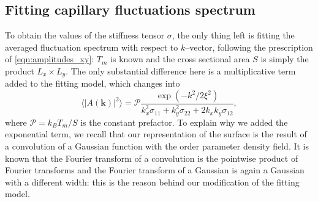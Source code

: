 


\subsection{Fitting capillary fluctuations spectrum}
To obtain the values of the stiffness tensor $\sigma$, the only thing left is fitting the averaged fluctuation spectrum with respect to $k$--vector, following the prescription of \cref{eqn:amplitudes_xy}: $T_m$ is known and the cross sectional area $S$ is simply the product $L_x\times L_y$. The only substantial difference here is a multiplicative term added to the fitting model, which changes into
\begin{equation}
\label{eqn:fit-model}
    \langle \lvert A(\bm{k}) \rvert^2 \rangle =\mathcal{P} \frac{\exp{(-k^2/2\xi^2)}}%
    {k_x^2\sigma_{11} + k_y^2\sigma_{22} +2k_x k_y\sigma_{12}},
\end{equation}
where $\mathcal{P}=k_BT_m/S$ is the constant prefactor. %
To explain why we added the exponential term, we recall that our representation of the surface is the result of a convolution of a Gaussian function with the order parameter density field. It is known that the Fourier transform of a convolution is the pointwise product of Fourier transforms and the Fourier transform of a Gaussian is again a Gaussian with a different width: this is the reason behind our modification of the fitting model.

